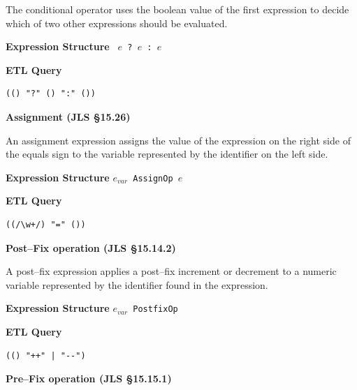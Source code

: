 \begin{chapterBody}
The conditional operator uses the boolean value of the first expression to
decide which of two other expressions should be evaluated.
\vspace{1em}

\begin{minipage}[t]{.45\linewidth}
\textbf{Expression Structure} \hfill\break
\texttt{
$e$ {\color{bp-blue}?} $e$ {\color{bp-blue}:} $e$
}
\end{minipage}
\begin{minipage}[t]{.45\linewidth}
\textbf{ETL Query}
\begin{lstlisting}[language=etl]
(() "?" () ":" ())
\end{lstlisting}
\end{minipage}

\noindent\textbf{Assignment (JLS \S15.26)}

An assignment expression assigns the value of the expression on the right
side of the equals sign to the variable represented by the identifier on the
left side.
\vspace{1em}

\begin{minipage}[t]{.45\linewidth}
\textbf{Expression Structure} \hfill\break
\texttt{$e_{var}$ AssignOp $e$}
\end{minipage}
\begin{minipage}[t]{.45\linewidth}
\textbf{ETL Query}
\begin{lstlisting}[language=etl]
((/\w+/) "=" ())
\end{lstlisting}
\end{minipage}

\noindent\textbf{Post–Fix operation (JLS \S15.14.2)}

A post–fix expression applies a post–fix increment or decrement to a numeric
variable represented by the identifier found in the expression.
\vspace{1em}

\begin{minipage}[t]{.45\linewidth}
\textbf{Expression Structure} \hfill\break
\texttt{$e_{var}$ PostfixOp}
\end{minipage}
\begin{minipage}[t]{.45\linewidth}
\textbf{ETL Query}
\begin{lstlisting}[language=etl]
(() "++" | "--")
\end{lstlisting}
\end{minipage}

\noindent\textbf{Pre–Fix operation (JLS \S15.15.1)}


\end{chapterBody}
